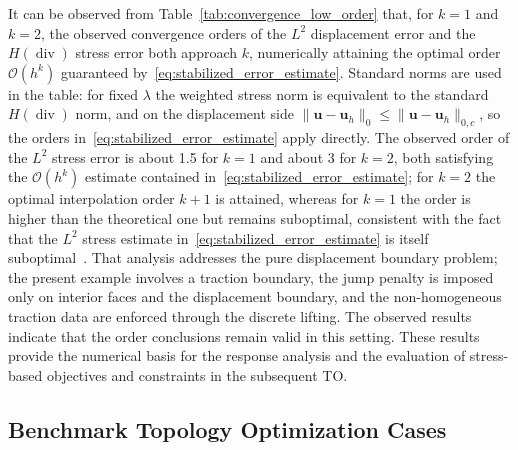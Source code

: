 It can be observed from Table~\ref{tab:convergence_low_order} that, for $k=1$ and $k=2$, the observed convergence orders of the $L^2$ displacement error and the $H(\operatorname{div})$ stress error both approach $k$, numerically attaining the optimal order $\mathcal{O}(h^k)$ guaranteed by~\eqref{eq:stabilized_error_estimate}. Standard norms are used in the table: for fixed $\lambda$ the weighted stress norm is equivalent to the standard $H(\operatorname{div})$ norm, and on the displacement side $\|\boldsymbol{u}-\boldsymbol{u}_h\|_0\le\|\boldsymbol{u}-\boldsymbol{u}_h\|_{0,c}$, so the orders in~\eqref{eq:stabilized_error_estimate} apply directly. The observed order of the $L^2$ stress error is about 1.5 for $k=1$ and about 3 for $k=2$, both satisfying the $\mathcal{O}(h^k)$ estimate contained in~\eqref{eq:stabilized_error_estimate}; for $k=2$ the optimal interpolation order $k+1$ is attained, whereas for $k=1$ the order is higher than the theoretical one but remains suboptimal, consistent with the fact that the $L^2$ stress estimate in~\eqref{eq:stabilized_error_estimate} is itself suboptimal~\cite{Chen2017}. That analysis addresses the pure displacement boundary problem; the present example involves a traction boundary, the jump penalty is imposed only on interior faces and the displacement boundary, and the non-homogeneous traction data are enforced through the discrete lifting. The observed results indicate that the order conclusions remain valid in this setting. These results provide the numerical basis for the response analysis and the evaluation of stress-based objectives and constraints in the subsequent TO.

\subsection{Benchmark Topology Optimization Cases}
\label{subsec:benchmark_topopt}

